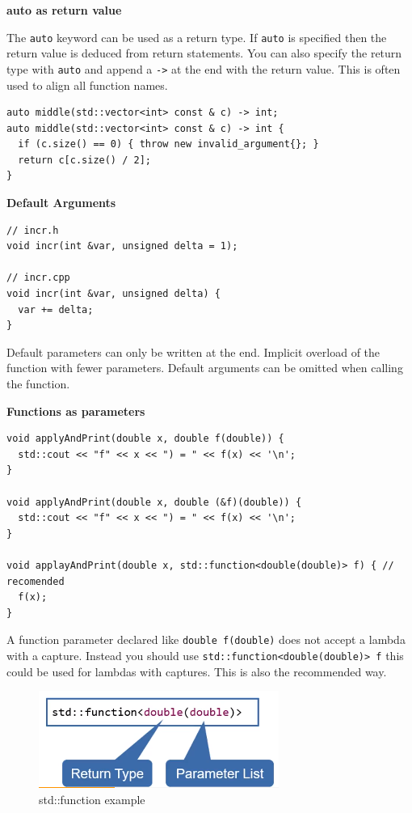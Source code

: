 \documentclass[11pt,twoside,landscape]{article}
\begin{document}
\begin{multicols}{3}
\textbf{auto as return value}

The \texttt{auto} keyword can be used as a return type. If \texttt{auto} is specified then the return value is deduced from return statements. You can also specify the return type with \texttt{auto} and append a \texttt{->} at the end with the return value. This is often used to align all function names.

\lstset{language=c++,label= ,caption= ,captionpos=b,numbers=none}
\begin{lstlisting}
auto middle(std::vector<int> const & c) -> int;
auto middle(std::vector<int> const & c) -> int {
  if (c.size() == 0) { throw new invalid_argument{}; }
  return c[c.size() / 2];
}
\end{lstlisting}

\textbf{Default Arguments}

\lstset{language=c++,label= ,caption= ,captionpos=b,numbers=none}
\begin{lstlisting}
// incr.h
void incr(int &var, unsigned delta = 1);

// incr.cpp
void incr(int &var, unsigned delta) {
  var += delta;
}
\end{lstlisting}

Default parameters can only be written at the end.
Implicit overload of the function with fewer parameters.
Default arguments can be omitted when calling the function.

\textbf{Functions as parameters}

\lstset{language=c++,label= ,caption= ,captionpos=b,numbers=none}
\begin{lstlisting}
void applyAndPrint(double x, double f(double)) {
  std::cout << "f" << x << ") = " << f(x) << '\n';
}

void applyAndPrint(double x, double (&f)(double)) {
  std::cout << "f" << x << ") = " << f(x) << '\n';
}

void applayAndPrint(double x, std::function<double(double)> f) { // recomended
  f(x);
}
\end{lstlisting}

A function parameter declared like \texttt{double f(double)} does not accept a lambda with a capture.
Instead you should use \texttt{std::function<double(double)> f} this could be used for lambdas with captures.
This is also the recommended way.

\begin{figure}[htbp]
\centering
\includegraphics[width=.9\linewidth]{img/std_function.png}
\caption{std::function example}
\end{figure}


\end{multicols}
\end{document}
